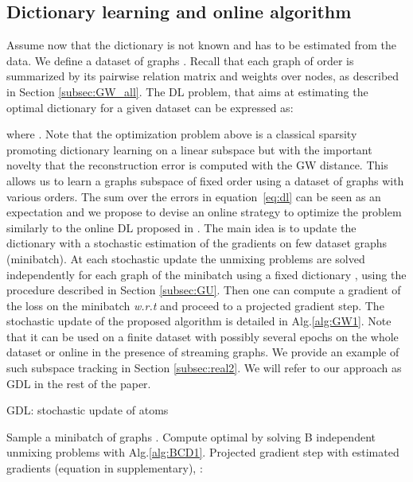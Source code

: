 \documentclass{article}
\def\eqref#1{equation~\ref{#1}}
\begin{document}
	\subsection{Dictionary learning and online algorithm}\label{subsec:algos}
	Assume now that the dictionary  is not known
	and has to be estimated from the data.
	We define a dataset of  graphs . Recall that each graph  of
	order  is summarized by its pairwise relation matrix  and weights  over nodes, as
	described in Section \ref{subsec:GW_all}.
	The DL problem, that aims at estimating the optimal dictionary
	for a given dataset can be expressed as:
	
	where . Note that the optimization problem above is a classical sparsity promoting
	dictionary learning on a linear subspace but with the important novelty
	that the reconstruction error is computed with the GW distance. This allows us to learn a graphs
	subspace of fixed
	order  using a dataset of graphs with various orders.
	The sum over the errors in \eqref{eq:dl} can be seen as an expectation and we
	propose to devise an online strategy to optimize the problem similarly to the
	online DL proposed in \citep{mairal2009online}. The main
	idea is to update the dictionary  with a stochastic
	estimation of the gradients on few dataset graphs (minibatch). At each
	stochastic update the unmixing problems are solved independently for each
	graph of the minibatch using a fixed dictionary 
	, {using the procedure described in Section
		\ref{subsec:GU}}. Then one can compute a gradient of the loss on the minibatch
	\emph{w.r.t} 
	 and proceed to a projected gradient step.  The
	stochastic update of the proposed
	algorithm is detailed in Alg.\ref{alg:GW1}. Note that it
	can be used on a finite dataset with possibly several epochs on the whole
	dataset or online in the presence of streaming graphs. We provide an example
	of such subspace tracking in Section \ref{subsec:real2}.  We will refer to our
	approach as GDL in the rest of the paper.

	\begin{algorithm}[t]
		\caption{GDL: stochastic update of atoms }
		\label{alg:GW1}
		\begin{algorithmic}[1]
			\STATE Sample a minibatch of graphs  .
			\STATE Compute optimal  by solving B independent unmixing problems with Alg.\ref{alg:BCD1}. 
			\STATE Projected gradient step with estimated gradients  (equation in supplementary), : \vspace{-2mm}
			
		\end{algorithmic}
	\end{algorithm}
	
\end{document}
